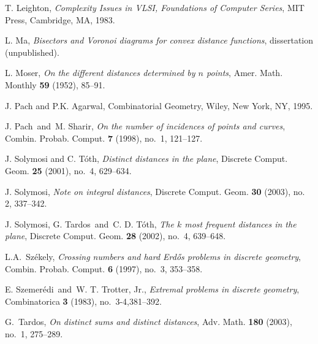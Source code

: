 \documentclass[]{stml-l}
\numberwithin{equation}{chapter}
\theoremstyle{plain}
\theoremstyle{definition}
\theoremstyle{remark}
\begin{document}
\begin{thebibliography}{55}


 T. Leighton, {\it Complexity Issues in VLSI, Foundations of Computer Series}, MIT Press, Cambridge, MA, 1983.

 L. Ma, {\it Bisectors and Voronoi diagrams for convex distance functions}, dissertation (unpublished).

 L. Moser, {\it On the different distances determined by $n$ points}, Amer. Math. Monthly {\bf 59} (1952), 85--91.

 J. Pach and P.K. Agarwal, {Combinatorial Geometry}, Wiley, New York, NY, 1995.

 J. Pach\ and\ M. Sharir, {\it On the number of incidences of points and curves}, Combin. Probab. Comput. {\bf 7} (1998), no.~1, 121--127.

 J. Solymosi and C. T\'{o}th, {\it Distinct distances in the plane}, Discrete Comput. Geom. {\bf 25} (2001), no.~4, 629--634.

 J. Solymosi, {\it Note on integral distances},
Discrete Comput. Geom.  {\bf 30}  (2003),  no. 2, 337--342.

 J. Solymosi, G. Tardos\ and\ C. D. T\'oth, \emph{The $k$ most frequent distances in the plane}, Discrete Comput. Geom. \textbf{28} (2002), no.~4, 639--648.




 L.A.~Sz\'{e}kely, {\it Crossing numbers and hard Erd\H{o}s problems in discrete geometry},
Combin. Probab. Comput. {\bf 6} (1997), no.~3, 353--358.

 E. Szemer\'edi\ and\ W. T. Trotter, Jr.,
{\it Extremal problems in discrete geometry}, Combinatorica {\bf 3}
(1983), no.~3-4,381--392.

 G.~Tardos, {\it On distinct sums and distinct distances}, Adv. Math. {\bf 180} (2003), no.~1, 275--289.

\end{thebibliography}

\end{document}
